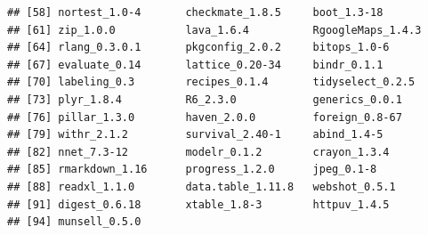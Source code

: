 \documentclass[12pt,a4paper,openany]{book}
\theoremstyle{definition}
\theoremstyle{definition}
\theoremstyle{definition}
\theoremstyle{remark}
\begin{document}
\begin{verbatim}
## [58] nortest_1.0-4       checkmate_1.8.5     boot_1.3-18        
## [61] zip_1.0.0           lava_1.6.4          RgoogleMaps_1.4.3  
## [64] rlang_0.3.0.1       pkgconfig_2.0.2     bitops_1.0-6       
## [67] evaluate_0.14       lattice_0.20-34     bindr_0.1.1        
## [70] labeling_0.3        recipes_0.1.4       tidyselect_0.2.5   
## [73] plyr_1.8.4          R6_2.3.0            generics_0.0.1     
## [76] pillar_1.3.0        haven_2.0.0         foreign_0.8-67     
## [79] withr_2.1.2         survival_2.40-1     abind_1.4-5        
## [82] nnet_7.3-12         modelr_0.1.2        crayon_1.3.4       
## [85] rmarkdown_1.16      progress_1.2.0      jpeg_0.1-8         
## [88] readxl_1.1.0        data.table_1.11.8   webshot_0.5.1      
## [91] digest_0.6.18       xtable_1.8-3        httpuv_1.4.5       
## [94] munsell_0.5.0
\end{verbatim}
\end{document}
